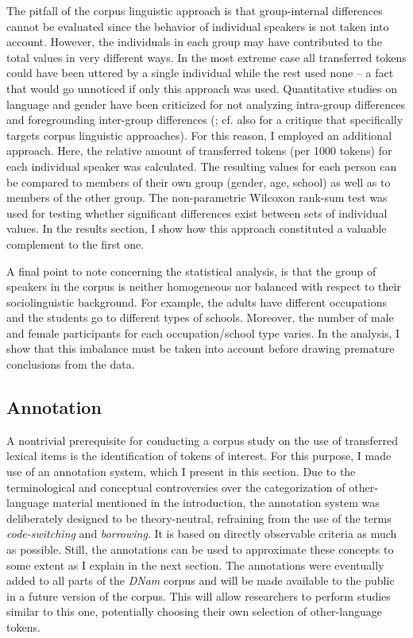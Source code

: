 \documentclass[output=paper]{langsci/langscibook}
\begin{document}
The pitfall of the corpus linguistic approach is that group-internal differences cannot be evaluated since the behavior of individual speakers is not taken into account. However, the individuals in each group may have contributed to the total values in very different ways. In the most extreme case all transferred tokens could have been uttered by a single individual while the rest used none – a fact that would go unnoticed if only this approach was used. Quantitative studies on language and gender have been criticized for not analyzing intra-group differences and foregrounding inter-group differences (\citealt[193]{eckert_new_1999}; cf. also \citealt{baker_using_2014} for a critique that specifically targets corpus linguistic approaches). For this reason, I employed an additional approach. Here, the relative amount of transferred tokens (per 1000 tokens) for each individual speaker was calculated. The resulting values for each person can be compared to members of their own group (gender, age, school) as well as to members of the other group. The non-parametric Wilcoxon rank-sum test was used for testing whether significant differences exist between sets of individual values. In the results section, I show how this approach constituted a valuable complement to the first one.

A final point to note concerning the statistical analysis, is that the group of speakers in the corpus is neither homogeneous nor balanced with respect to their sociolinguistic background. For example, the adults have different occupations and the students go to different types of schools. Moreover, the number of male and female participants for each occupation/school type varies. In the analysis, I show that this imbalance must be taken into account before drawing premature conclusions from the data.

 
   
\subsection{Annotation}
  \label{sec:bracke:4.2}
 

A nontrivial prerequisite for conducting a corpus study on the use of transferred lexical items is the identification of tokens of interest. For this purpose, I made use of an annotation system, which I present in this section. Due to the terminological and conceptual controversies over the categorization of other-language material mentioned in the introduction, the annotation system was deliberately designed to be theory-neutral, refraining from the use of the terms \textit{code-switching} and \textit{borrowing}. It is based on directly observable criteria as much as possible. Still, the annotations can be used to approximate these concepts to some extent as I explain in the next section. The annotations were eventually added to all parts of the \textit{DNam} corpus and will be made available to the public in a future version of the corpus. This will allow researchers to perform studies similar to this one, potentially choosing their own selection of other-language tokens.
\end{document}
